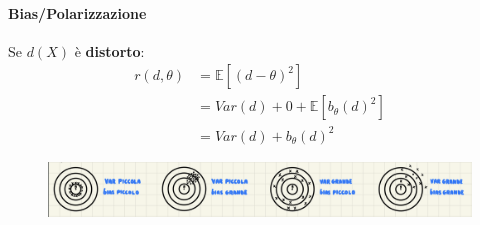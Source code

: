 \documentclass[]{article}
\newcommand{\ev}{\mathbb{E}[X]}
\renewcommand{\ev}[1]{\mathbb{E}[#1]}
\begin{document}
    \paragraph{Bias/Polarizzazione}
    Se $d(X)$ è \textbf{distorto}:
    \begin{equation*}
        \begin{split}
            r(d, \theta) &= \ev{(d - \theta)^2} \\
            &= Var(d) + 0 + \ev{b_\theta (d)^2} \\
            &= Var(d) + b_\theta(d)^2
        \end{split}
    \end{equation*}
    \begin{figure}[h]
        \includegraphics[width=\textwidth]{images/boh_4.png}    
    \end{figure}
\end{document}
